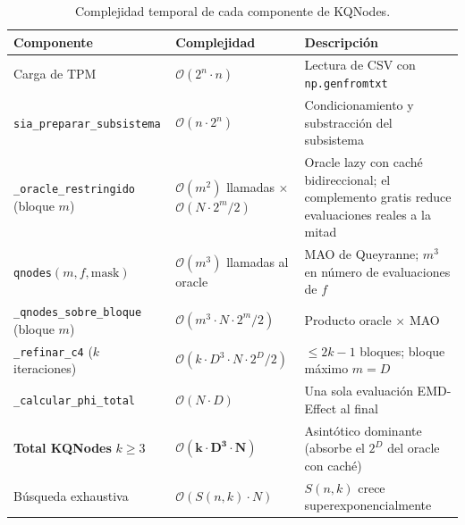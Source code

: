 \begin{table}[H]
  \centering
  \caption{Complejidad temporal de cada componente de KQNodes.}
  \label{tab:complejidad_kqnodes}
  \begin{tabular}{p{4.2cm} p{3.5cm} p{5.5cm}}
    \toprule
    \textbf{Componente} & \textbf{Complejidad} & \textbf{Descripción} \\
    \midrule
    Carga de TPM
      & $\mathcal{O}(2^n \cdot n)$
      & Lectura de CSV con \texttt{np.genfromtxt} \\[3pt]

    \texttt{sia\_preparar\_subsistema}
      & $\mathcal{O}(n \cdot 2^n)$
      & Condicionamiento y substracción del subsistema \\[3pt]

    \texttt{\_oracle\_restringido} (bloque $m$)
      & $\mathcal{O}(m^2)$ llamadas $\times$ $\mathcal{O}(N \cdot 2^m / 2)$
      & Oracle lazy con caché bidireccional; el complemento gratis reduce evaluaciones reales a la mitad \\[3pt]

    \texttt{qnodes}$(m, f, \text{mask})$
      & $\mathcal{O}(m^3)$ llamadas al oracle
      & MAO de Queyranne; $m^3$ en número de evaluaciones de $f$ \\[3pt]

    \texttt{\_qnodes\_sobre\_bloque} (bloque $m$)
      & $\mathcal{O}(m^3 \cdot N \cdot 2^m / 2)$
      & Producto oracle $\times$ MAO \\[3pt]

    \texttt{\_refinar\_c4} ($k$ iteraciones)
      & $\mathcal{O}(k \cdot D^3 \cdot N \cdot 2^D / 2)$
      & $\leq 2k{-}1$ bloques; bloque máximo $m = D$ \\[3pt]

    \texttt{\_calcular\_phi\_total}
      & $\mathcal{O}(N \cdot D)$
      & Una sola evaluación EMD-Effect al final \\[3pt]

    \midrule
    \textbf{Total KQNodes} $k \geq 3$
      & $\boldsymbol{\mathcal{O}(k \cdot D^3 \cdot N)}$
      & Asintótico dominante (absorbe el $2^D$ del oracle con caché) \\[3pt]

    Búsqueda exhaustiva
      & $\mathcal{O}(S(n,k) \cdot N)$
      & $S(n,k)$ crece superexponencialmente \\
    \bottomrule
  \end{tabular}
\end{table}

